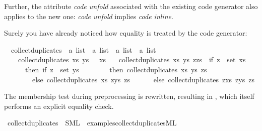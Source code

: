 \begin{isabellebody}
\begin{isamarkuptext}
\begin{warn}
    Further, the attribute \emph{code unfold}
    associated with the existing code generator also applies to
    the new one: \emph{code unfold} implies \emph{code inline}.
  \end{warn}%
\end{isamarkuptext}%
\isamarkuptrue%
%
\isamarkuptrue%
%
\begin{isamarkuptext}%
Surely you have already noticed how equality is treated
  by the code generator:%
\end{isamarkuptext}%
\isamarkuptrue%
\isamarkupfalse%
\isanewline
\ \ collect{\isacharunderscore}duplicates\ {\isacharcolon}{\isacharcolon}\ {\isachardoublequoteopen}{\isacharprime}a\ list\ {\isasymRightarrow}\ {\isacharprime}a\ list\ {\isasymRightarrow}\ {\isacharprime}a\ list\ {\isasymRightarrow}\ {\isacharprime}a\ list{\isachardoublequoteclose}\ \isanewline
\ \ \ \ {\isachardoublequoteopen}collect{\isacharunderscore}duplicates\ xs\ ys\ {\isacharbrackleft}{\isacharbrackright}\ {\isacharequal}\ xs{\isachardoublequoteclose}\isanewline
\ \ {\isacharbar}\ {\isachardoublequoteopen}collect{\isacharunderscore}duplicates\ xs\ ys\ {\isacharparenleft}z{\isacharhash}zs{\isacharparenright}\ {\isacharequal}\ {\isacharparenleft}if\ z\ {\isasymin}\ set\ xs\isanewline
\ \ \ \ \ \ then\ if\ z\ {\isasymin}\ set\ ys\isanewline
\ \ \ \ \ \ \ \ then\ collect{\isacharunderscore}duplicates\ xs\ ys\ zs\isanewline
\ \ \ \ \ \ \ \ else\ collect{\isacharunderscore}duplicates\ xs\ {\isacharparenleft}z{\isacharhash}ys{\isacharparenright}\ zs\isanewline
\ \ \ \ \ \ else\ collect{\isacharunderscore}duplicates\ {\isacharparenleft}z{\isacharhash}xs{\isacharparenright}\ {\isacharparenleft}z{\isacharhash}ys{\isacharparenright}\ zs{\isacharparenright}{\isachardoublequoteclose}%
\begin{isamarkuptext}%
The membership test during preprocessing is rewritten,
  resulting in , which itself
  performs an explicit equality check.%
\end{isamarkuptext}%
\isamarkuptrue%
\isamarkupfalse%
\ collect{\isacharunderscore}duplicates\ \ SML\ \ {\isachardoublequoteopen}examples{\isacharslash}collect{\isacharunderscore}duplicates{\isachardot}ML{\isachardoublequoteclose}%
\begin{isamarkuptext}%
%
\end{isamarkuptext}%
\isamarkuptrue%
%

\end{isabellebody}
